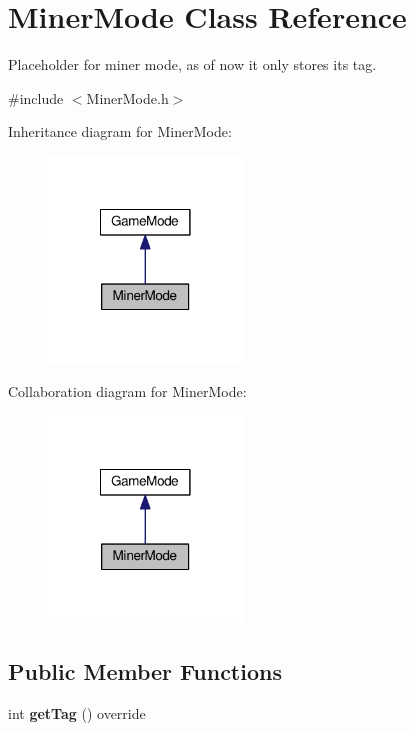 \hypertarget{classMinerMode}{\section{Miner\-Mode Class Reference}
\label{classMinerMode}
}


Placeholder for miner mode, as of now it only stores its tag.  




{\ttfamily \#include $<$Miner\-Mode.\-h$>$}



Inheritance diagram for Miner\-Mode\-:
\nopagebreak
\begin{figure}[H]
\begin{center}
\leavevmode
\includegraphics[width=146pt]{classMinerMode__inherit__graph}
\end{center}
\end{figure}


Collaboration diagram for Miner\-Mode\-:
\nopagebreak
\begin{figure}[H]
\begin{center}
\leavevmode
\includegraphics[width=146pt]{classMinerMode__coll__graph}
\end{center}
\end{figure}
\subsection*{Public Member Functions}
\begin{DoxyCompactItemize}
\item 
\hypertarget{classMinerMode_a19dfa01ef09d7e579d124fd58d555137}{int {\bfseries get\-Tag} () override}\label{classMinerMode_a19dfa01ef09d7e579d124fd58d555137}

\end{DoxyCompactItemize}
